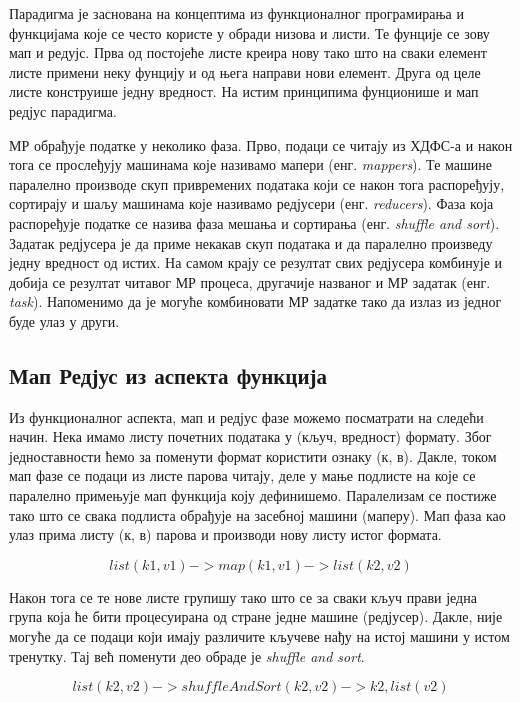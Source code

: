 \documentclass[12pt,oneside]{memoir}
\begin{document}
Парадигма је заснована на концептима из функционалног програмирања и функцијама које се често користе у обради низова и листи. Те фунције се зову мап и редујс. Прва од постојеће листе креира нову тако што на сваки елемент листе примени неку фунцију и од њега направи нови елемент. Друга од целе листе конструише једну вредност. На истим принципима фунционише и мап редјус парадигма.

МР обрађује податке у неколико фаза. Прво, подаци се читају из ХДФС-а и након тога се прослеђују машинама које називамо мапери (енг. \textit{mappers}). Те машине паралелно производе скуп привремених података који се након тога распоређују, сортирају и шаљу машинама које називамо редјусери (енг. \textit{reducers}). Фаза која распоређује податке се назива фаза мешања и сортирања (енг. \textit{shuffle and sort}). Задатак редјусера је да приме некакав скуп података и да паралелно произведу једну вредност од истих. На самом крају се резултат свих редјусера комбинује и добија се резултат читавог МР процеса, другачије названог и МР задатак (енг. \textit{task}). Напоменимо да је могуће комбиновати МР задатке тако да излаз из једног буде улаз у други. \cite{hadoop_learning}

\subsection{Мап Редјус из аспекта функција}
\label{subsec:mr_funck_asp}

Из функционалног аспекта, мап и редјус фазе можемо посматрати на следећи начин. Нека имамо листу почетних података у (кључ, вредност) формату. Због једноставности ћемо за поменути формат користити ознаку (к, в). Дакле, током мап фазе се подаци из листе парова читају, деле у мање подлисте на које се паралелно примењује мап функција коју дефинишемо. Паралелизам се постиже тако што се свака подлиста обрађује на засебној машини (маперу). Мап фаза као улаз прима листу (к, в) парова и производи нову листу истог формата. \cite{hadoop_learning}

$$ list(k1, v1) -> map(k1, v1) -> list(k2, v2) $$

Након тога се те нове листе групишу тако што се за сваки кључ прави једна група која ће бити процесуирана од стране једне машине (редјусер). Дакле, није могуће да се подаци који имају различите кључеве нађу на истој машини у истом тренутку. Тај већ поменути део обраде је \textit{shuffle and sort}. 

$$ list(k2, v2) -> shuffleAndSort(k2, v2) -> k2, list(v2) $$
\end{document}
